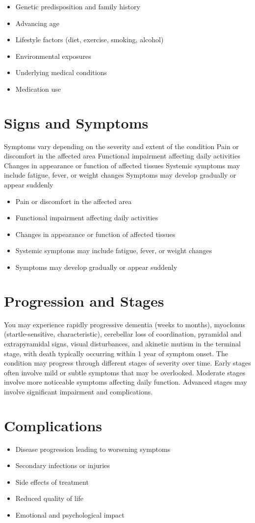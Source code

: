 \begin{itemize}[noitemsep]
  \item Genetic predisposition and family history
  \item Advancing age
  \item Lifestyle factors (diet, exercise, smoking, alcohol)
  \item Environmental exposures
  \item Underlying medical conditions
  \item Medication use
\end{itemize}
\section{Signs and Symptoms}
Symptoms vary depending on the severity and extent of the condition Pain or discomfort in the affected area Functional impairment affecting daily activities Changes in appearance or function of affected tissues Systemic symptoms may include fatigue, fever, or weight changes Symptoms may develop gradually or appear suddenly

\begin{itemize}[noitemsep]
  \item Pain or discomfort in the affected area
  \item Functional impairment affecting daily activities
  \item Changes in appearance or function of affected tissues
  \item Systemic symptoms may include fatigue, fever, or weight changes
  \item Symptoms may develop gradually or appear suddenly
\end{itemize}
\section{Progression and Stages}
You may experience rapidly progressive dementia (weeks to months), myoclonus (startle-sensitive, characteristic), cerebellar loss of coordination, pyramidal and extrapyramidal signs, visual disturbances, and akinetic mutism in the terminal stage, with death typically occurring within 1 year of symptom onset. The condition may progress through different stages of severity over time. Early stages often involve mild or subtle symptoms that may be overlooked. Moderate stages involve more noticeable symptoms affecting daily function. Advanced stages may involve significant impairment and complications.
\section{Complications}
\begin{itemize}[noitemsep]
  \item Disease progression leading to worsening symptoms
  \item Secondary infections or injuries
  \item Side effects of treatment
  \item Reduced quality of life
  \item Emotional and psychological impact
\end{itemize}
